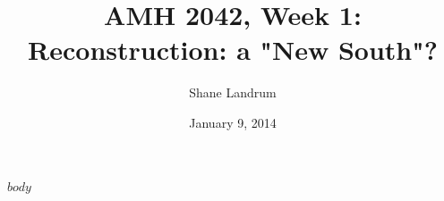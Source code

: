 \documentclass{tufte-handout}[10pt]
\title{AMH 2042, Week 1: Reconstruction: a "New South"?}
\author{Shane Landrum}
\date{January 9, 2014}  %
\begin{document}
\maketitle%

$body$
\end{document}
